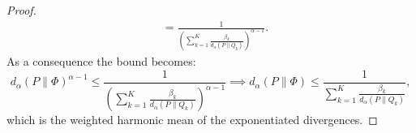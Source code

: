 \documentclass{article}
\begin{document}
\begin{proof}
\begin{align*}
        & = \frac{1} {\left(\sum_{k=1}^K \frac{ \beta_k}{ d_{\alpha}(P \| Q_k)}\right)^{\alpha-1}}.
    \end{align*}
    As a consequence the bound becomes:
    \begin{equation*}
        d_{\alpha}(P \| \Phi)^{\alpha-1} \le  \frac{1} {\left(\sum_{k=1}^K \frac{\beta_k}{ d_{\alpha}(P \| Q_k)}\right)^{\alpha-1}} \implies  d_{\alpha}(P \| \Phi) \le \frac{1} {\sum_{k=1}^K \frac{ \beta_k}{ d_{\alpha}(P \| Q_k)}},
    \end{equation*}
    which is the weighted harmonic mean of the exponentiated divergences.
\end{proof}

\end{document}
